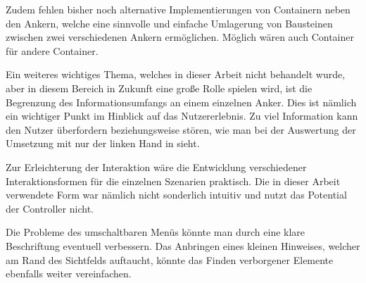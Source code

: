 		
		Zudem fehlen bisher noch alternative Implementierungen von Containern neben den Ankern, welche eine sinnvolle und einfache Umlagerung von Bausteinen zwischen zwei verschiedenen Ankern ermöglichen. Möglich wären auch Container für andere Container.
				
		
		Ein weiteres wichtiges Thema, welches in dieser Arbeit nicht behandelt wurde, aber in diesem Bereich in Zukunft eine große Rolle spielen wird, ist die Begrenzung des Informationsumfangs an einem einzelnen Anker. Dies ist nämlich ein wichtiger Punkt im Hinblick auf das Nutzererlebnis. Zu viel Information kann den Nutzer überfordern beziehungsweise stören, wie man bei der Auswertung der Umsetzung mit nur der linken Hand in  sieht.
		
		
		Zur Erleichterung der Interaktion wäre die Entwicklung verschiedener Interaktionsformen für die einzelnen Szenarien praktisch. Die in dieser Arbeit verwendete Form war nämlich nicht sonderlich intuitiv und nutzt das Potential der Controller nicht.
		
		
		Die Probleme des umschaltbaren Menüs könnte man durch eine klare Beschriftung eventuell verbessern. Das Anbringen eines kleinen Hinweises, welcher am Rand des Sichtfelds auftaucht, könnte das Finden verborgener Elemente ebenfalls weiter vereinfachen.
	
		
